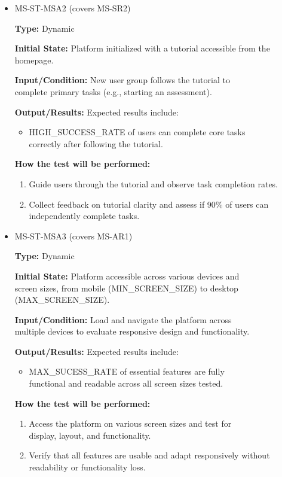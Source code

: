 \documentclass[12pt, titlepage]{article}
\begin{document}
\begin{itemize}
  \item MS-ST-MSA2 (covers MS-SR2) 
  \begin{mdframed}[linewidth=0.5mm] 
    \textbf{Type:} Dynamic \par 
    \textbf{Initial State:} Platform initialized with a tutorial accessible from the homepage. \par 
    \textbf{Input/Condition:} New user group follows the tutorial to \\complete primary tasks (e.g., starting an assessment). \par 
    \textbf{Output/Results:} Expected results include: 
    \begin{itemize} 
      \item HIGH\_SUCCESS\_RATE of users can complete core tasks \\correctly after following the tutorial. 
    \end{itemize} \par \textbf{How the test will be performed:} 
    \begin{enumerate}[noitemsep] 
      \item Guide users through the tutorial and observe task completion rates. 
      \item Collect feedback on tutorial clarity and assess if 90\% of users can independently complete tasks. 
    \end{enumerate} 
  \end{mdframed}

  \item MS-ST-MSA3 (covers MS-AR1)
  \begin{mdframed}[linewidth=0.5mm] 
    \textbf{Type:} Dynamic \par 
    \textbf{Initial State:} Platform accessible across various devices and \\screen sizes, from mobile (MIN\_SCREEN\_SIZE) to desktop \\(MAX\_SCREEN\_SIZE). \par 
    \textbf{Input/Condition:} Load and navigate the platform across \\multiple devices to evaluate responsive design and functionality. \par 
    \textbf{Output/Results:} Expected results include: 
    \begin{itemize} 
      \item MAX\_SUCESS\_RATE of essential features are fully \\functional and readable across all screen sizes tested. 
    \end{itemize} \par 
    \textbf{How the test will be performed:} 
    \begin{enumerate}[noitemsep] 
      \item Access the platform on various screen sizes and test for \\display, layout, and functionality. 
      \item Verify that all features are usable and adapt responsively without readability or functionality loss. 
    \end{enumerate} 
  \end{mdframed} 
\end{itemize}
\end{document}
